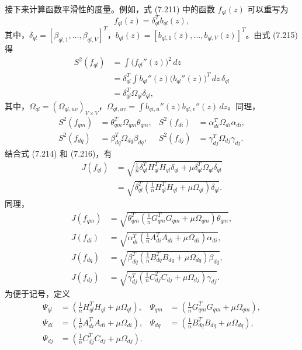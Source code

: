接下来计算函数平滑性的度量。例如，式 (7.211) 中的函数 $f_{ql}(z)$ 可以重写为
\begin{equation}
f_{ql}(z)=\delta_{ql}^Tb_{ql}(z),
\tag{7.215}
\end{equation}
其中，$\delta_{ql}=[\beta_{ql,1},\ldots,\beta_{ql,V}]^T$，$b_{ql}(z)=[b_{ql,1}(z),\ldots,b_{ql,V}(z)]^T$。由式 (7.215) 得
\begin{equation}
\begin{aligned}
S^2(f_{ql})&=\int\bigl(f_{ql}''(z)\bigr)^2\,dz\\
&=\delta_{ql}^T\int b_{ql}''(z)\bigl(b_{ql}''(z)\bigr)^T\,dz\,\delta_{ql}\\
&=\delta_{ql}^T\Omega_{ql}\delta_{ql},
\end{aligned}
\tag{7.216}
\end{equation}
其中，$\Omega_{ql}=(\Omega_{ql,uv})_{V\times V}$，$\Omega_{ql,uv}=\int b_{qi,u}''(z)b_{ql,v}''(z)\,dz$。同理，
\[
\begin{aligned}
S^2(f_{qm})&=\theta_{qm}^T\Omega_{qm}\theta_{qm},&
S^2(f_{di})&=\alpha_{di}^T\Omega_{di}\alpha_{di},\\
S^2(f_{dq})&=\beta_{dq}^T\Omega_{dq}\beta_{dq},&
S^2(f_{dj})&=\gamma_{dj}^T\Omega_{dj}\gamma_{dj}.
\end{aligned}
\]
结合式 (7.214) 和 (7.216)，有
\begin{equation}
\begin{aligned}
J(f_{ql})&=\sqrt{\frac1n\delta_{ql}^TH_{ql}^TH_{ql}\delta_{ql}+\mu\delta_{ql}^T\Omega_{ql}\delta_{ql}}\\
&=\sqrt{\delta_{ql}^T\left(\frac1nH_{ql}^TH_{ql}+\mu\Omega_{ql}\right)\delta_{ql}}.
\end{aligned}
\tag{7.217}
\end{equation}
同理，
\begin{equation}
\begin{aligned}
J(f_{qm})&=\sqrt{\theta_{qm}^T\left(\frac1nG_{qm}^TG_{qm}+\mu\Omega_{qm}\right)\theta_{qm}},\\
J(f_{di})&=\sqrt{\alpha_{di}^T\left(\frac1nA_{di}^TA_{di}+\mu\Omega_{di}\right)\alpha_{di}},\\
J(f_{dq})&=\sqrt{\beta_{dq}^T\left(\frac1nB_{dq}^TB_{dq}+\mu\Omega_{dq}\right)\beta_{dq}},\\
J(f_{dj})&=\sqrt{\gamma_{dj}^T\left(\frac1nC_{dj}^TC_{dj}+\mu\Omega_{dj}\right)\gamma_{dj}}.
\end{aligned}
\tag{7.218}
\end{equation}
为便于记号，定义
\begin{equation}
\begin{aligned}
\Psi_{ql}&=\left(\frac1nH_{ql}^TH_{ql}+\mu\Omega_{ql}\right),&
\Psi_{qm}&=\left(\frac1nG_{qm}^TG_{qm}+\mu\Omega_{qm}\right),\\
\Psi_{di}&=\left(\frac1nA_{di}^TA_{di}+\mu\Omega_{di}\right),&
\Psi_{dq}&=\left(\frac1nB_{dq}^TB_{dq}+\mu\Omega_{dq}\right),\\
\Psi_{dj}&=\left(\frac1nC_{dj}^TC_{dj}+\mu\Omega_{dj}\right).&&
\end{aligned}
\tag{7.219}
\end{equation}
